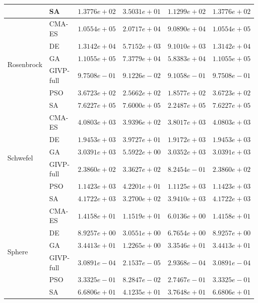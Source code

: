 \begin{table}[htb]
\begin{tabular}{llrrrr}
   & SA & $1.3776e+02$ & $3.5031e+01$ & $1.1299e+02$ & $1.3776e+02$ \\
\midrule
  \multirow{6}{*}{Rosenbrock} & CMA-ES & $1.0554e+05$ & $2.0717e+04$ & $9.0890e+04$ & $1.0554e+05$ \\
   & DE & $1.3142e+04$ & $5.7152e+03$ & $9.1010e+03$ & $1.3142e+04$ \\
   & GA & $1.1055e+05$ & $7.3779e+04$ & $5.8383e+04$ & $1.1055e+05$ \\
   & GIVP-full & $9.7508e-01$ & $9.1226e-02$ & $9.1058e-01$ & $9.7508e-01$ \\
   & PSO & $3.6723e+02$ & $2.5662e+02$ & $1.8577e+02$ & $3.6723e+02$ \\
   & SA & $7.6227e+05$ & $7.6000e+05$ & $2.2487e+05$ & $7.6227e+05$ \\
\midrule
  \multirow{6}{*}{Schwefel} & CMA-ES & $4.0803e+03$ & $3.9396e+02$ & $3.8017e+03$ & $4.0803e+03$ \\
   & DE & $1.9453e+03$ & $3.9727e+01$ & $1.9172e+03$ & $1.9453e+03$ \\
   & GA & $3.0391e+03$ & $5.5922e+00$ & $3.0352e+03$ & $3.0391e+03$ \\
   & GIVP-full & $2.3860e+02$ & $3.3627e+02$ & $8.2454e-01$ & $2.3860e+02$ \\
   & PSO & $1.1423e+03$ & $4.2201e+01$ & $1.1125e+03$ & $1.1423e+03$ \\
   & SA & $4.1722e+03$ & $3.2700e+02$ & $3.9410e+03$ & $4.1722e+03$ \\
\midrule
  \multirow{6}{*}{Sphere} & CMA-ES & $1.4158e+01$ & $1.1519e+01$ & $6.0136e+00$ & $1.4158e+01$ \\
   & DE & $8.9257e+00$ & $3.0551e+00$ & $6.7654e+00$ & $8.9257e+00$ \\
   & GA & $3.4413e+01$ & $1.2265e+00$ & $3.3546e+01$ & $3.4413e+01$ \\
   & GIVP-full & $3.0891e-04$ & $2.1537e-05$ & $2.9368e-04$ & $3.0891e-04$ \\
   & PSO & $3.3325e-01$ & $8.2847e-02$ & $2.7467e-01$ & $3.3325e-01$ \\
   & SA & $6.6806e+01$ & $4.1235e+01$ & $3.7648e+01$ & $6.6806e+01$ \\
\bottomrule
\end{tabular}


\end{table}
